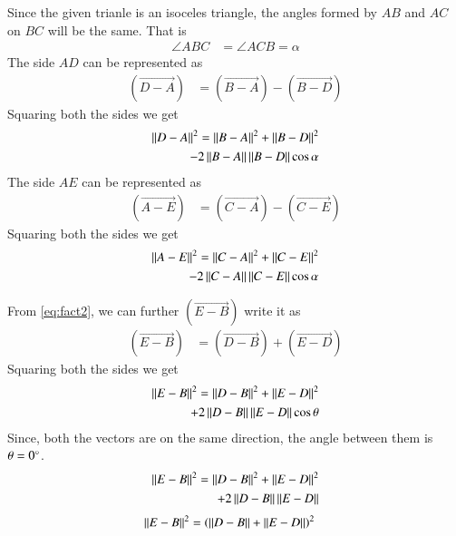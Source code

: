 \documentclass[journal,12pt,twocolumn]{IEEEtran}
\begin{document}
	Since the given trianle is an isoceles triangle, the angles formed by $AB$ and $AC$ on $BC$ will be the same. That is
	\begin{align}\label{eq:fact3}
		\angle ABC &= \angle ACB = \alpha
	\end{align}
	The side $AD$ can be represented as 
	\begin{align}\label{eq:eq1}
		(\vec{D-A}) &= (\vec{B-A}) - (\vec{B-D})
	\end{align}
	Squaring both the sides we get	
	\begin{align} \label{eq:eq2}
		\left\lVert D-A\right\rVert^{2} = \left\lVert B-A\right\rVert^{2} + \left\lVert B-D\right\rVert^{2} \nonumber \\ - 2\left\lVert B-A\right\rVert\left\lVert B-D\right\rVert\cos\alpha
	\end{align}
	The side $AE$ can be represented as 
	\begin{align}\label{eq:eq3}
		(\vec{A-E}) &= (\vec{C-A}) - (\vec{C-E})
	\end{align}
	Squaring both the sides we get	
	\begin{align} \label{eq:eq4}
		\left\lVert A-E\right\rVert^{2} = \left\lVert C-A\right\rVert^{2} + \left\lVert C-E\right\rVert^{2} \nonumber \\  - 2\left\lVert C-A\right\rVert\left\lVert C-E\right\rVert\cos\alpha
	\end{align}
	
	From \eqref{eq:fact2}, we can further $(\vec{E-B})$ write it as 
	\begin{align}\label{eq:eq5}
		(\vec{E-B}) &= (\vec{D-B}) + (\vec{E-D})
	\end{align}
	Squaring both the sides we get
	\begin{align} \label{eq:eq6}
		\left\lVert E-B\right\rVert^{2} = \left\lVert D-B\right\rVert^{2} + \left\lVert E-D\right\rVert^{2} \nonumber \\ + 2\left\lVert D-B\right\rVert\left\lVert E-D\right\rVert\cos\theta
	\end{align}
	Since, both the vectors are on the same direction, the angle between them is $\theta = 0\degree$.
	\begin{align} \label{eq:eq7}
		\left\lVert E-B\right\rVert^{2} = \left\lVert D-B\right\rVert^{2} + \left\lVert E-D\right\rVert^{2} \nonumber \\ + 2\left\lVert D-B\right\rVert\left\lVert E-D\right\rVert
	\end{align}
	\begin{align}\label{eq:eq8}
		\left\lVert E-B\right\rVert^{2} &= \left(\left\lVert D-B\right\rVert + \left\lVert E-D\right\rVert\right)^{2}
	\end{align}
\end{document}
